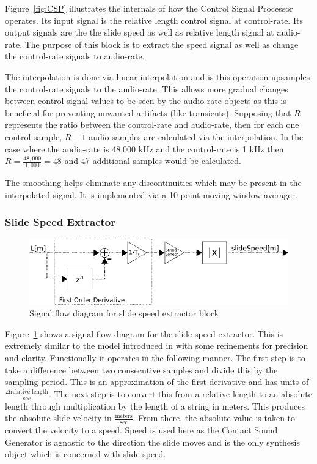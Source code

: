 \documentclass[../main.tex]{subfiles}
\begin{document}
Figure~\ref{fig:CSP} illustrates the internals of how the Control Signal Processor operates. Its input signal is the relative length control signal at control-rate. Its output signals are the the slide speed as well as relative length signal at audio-rate. The purpose of this block is to extract the speed signal as well as change the control-rate signals to audio-rate.

The interpolation is done via linear-interpolation and is this operation upsamples the control-rate signals to the audio-rate. This allows more gradual changes between control signal values to be seen by the audio-rate objects as this is beneficial for preventing unwanted artifacts (like transients). Supposing that $R$ represents the ratio between the control-rate and audio-rate, then for each one control-sample, $R-1$ audio samples are calculated via the interpolation. In the case where the audio-rate is 48,000 kHz and the control-rate is 1 kHz then $R = \frac{48,000}{1,000} = 48$ and 47 additional samples would be calculated.

The smoothing helps eliminate any discontinuities which may be present in the interpolated signal. It is implemented via a 10-point moving window averager.

\subsubsection{Slide Speed Extractor}

\begin{figure}[h]
    \centering
    \includegraphics[scale=.5]{./images/diagrams/slideSpeedExtractor.png}
    \caption{Signal flow diagram for slide speed extractor block}
    \label{fig:SSE}
\end{figure}

Figure~\ref{fig:SSE} shows a signal flow diagram for the slide speed extractor. This is extremely similar to the model introduced in  with some refinements for precision and clarity. Functionally it operates in the following manner. The first step is to take a difference between two consecutive samples and divide this by the sampling period. This is an approximation of the first derivative and has units of $\frac{\Delta \text{relative length}}{\text{sec}}$. The next step is to convert this from a relative length to an absolute length through multiplication by the length of a string in meters. This produces the absolute slide velocity in $\frac{\text{meters}}{\text{sec}}$. From there, the absolute value is taken to convert the velocity to a speed. Speed is used here as the Contact Sound Generator is agnostic to the direction the slide moves and is the only synthesis object which is concerned with slide speed.
\end{document}
